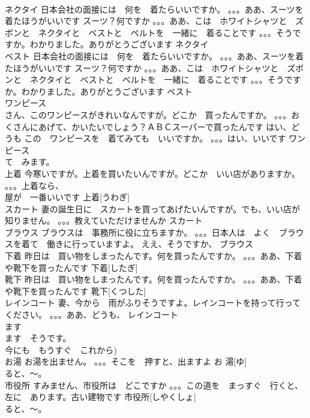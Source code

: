 \documentclass[8pt]{extreport}
\begin{document}
\begin{CJK}{UTF8}{min}
\\	ネクタイ	日本会社の面接には　何を　着たらいいですか。 。。。ああ、スーツを着たほうがいいです スーツ？何ですか 。。。ああ、こは　ホワイトシャツと　ズボンと　ネクタイと　ベストと　ベルトを　一緒に　着ることです 。。。そうですか。わかりました。ありがとうございます	ネクタイ			
\\	ベスト	日本会社の面接には　何を　着たらいいですか。 。。。ああ、スーツを着たほうがいいです スーツ？何ですか 。。。ああ、こは　ホワイトシャツと　ズボンと　ネクタイと　ベストと　ベルトを　一緒に　着ることです 。。。そうですか。わかりました。ありがとうございます	ベスト			
\\	ワンピース	
\\	さん、このワンピースがきれいなんですが。どこか　買ったんですか。 。。。おくさんにあげて、かいたいでしょう？ＡＢＣスーパーで買ったんです はい、どうも この　ワンピースを　着てみても　いいですか。 。。。はい、いいです	ワンピース			
\\	て　みます。
\\	上着	今寒いですが。上着を買いたいんですが。どこか　いい店がありますか。 。。。上着なら、
\\	屋が　一番いいです	上着[うわぎ]			
\\	スカート	妻の誕生日に　スカートを買ってあげたいんですが。でも、いい店が知りません。 。。。教えていただけませんか	スカート			
\\	ブラウス	ブラウスは　事務所に役に立ちますか。 。。。日本人は　よく　ブラウスを着て　働きに行っていますよ。 ええ、そうですか、	ブラウス			
\\	下着	昨日は　買い物をしまったんです。何を買ったんですか。 。。。ああ、下着や靴下を買ったんです	下着[したぎ]			
\\	靴下	昨日は　買い物をしまったんです。何を買ったんですか。 。。。ああ、下着や靴下を買ったんです	靴下[くつした]			
\\	レインコート	妻、今から　雨がふりそうですよ。レインコートを持って行ってください。 。。。ああ、どうも、	レインコート			
\\	ます　
\\	ます　そうです。
\\	今にも　もうすぐ　これから)		
\\	お湯	お湯を出ません。 。。。そこを　押すと、出ますよ	お 湯[ゆ]			
\\	ると、～。
\\	市役所	すみません、市役所は　どこですか 。。。この道を　まっすぐ　行くと、左に　あります。古い建物です	市役所[しやくしょ]			
\\	ると、～。

\end{CJK}
\end{document}
